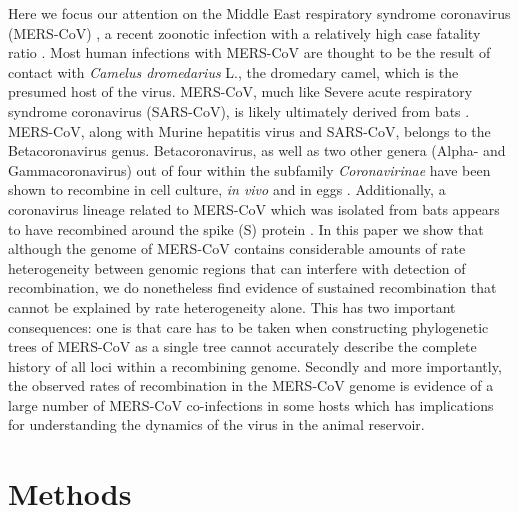 \documentclass[11pt,oneside,letterpaper]{article}
\begin{document}
Here we focus our attention on the Middle East respiratory syndrome coronavirus (MERS-CoV) \citep{zaki_2012}, a recent zoonotic infection with a relatively high case fatality ratio \citep{cauchemez_2014,memish_2013,assiri_2013}.
Most human infections with MERS-CoV are thought to be the result of contact with \textit{Camelus dromedarius} L., the dromedary camel, which is the presumed host of the virus.
MERS-CoV, much like Severe acute respiratory syndrome coronavirus (SARS-CoV), is likely ultimately derived from bats \citep{corman_rooting_2014}.
MERS-CoV, along with Murine hepatitis virus and SARS-CoV, belongs to the Betacoronavirus genus.
Betacoronavirus, as well as two other genera (Alpha- and Gammacoronavirus) out of four within the subfamily \textit{Coronavirinae} have been shown to recombine in cell culture, \textit{in vivo} and in eggs \citep{lai_1985,makino_1986,keck_1988,kottier_1995,herrewegh_1998}.
Additionally, a coronavirus lineage related to MERS-CoV which was isolated from bats appears to have recombined around the spike (S) protein \citep{corman_rooting_2014}.
In this paper we show that although the genome of MERS-CoV contains considerable amounts of rate heterogeneity between genomic regions that can interfere with detection of recombination, we do nonetheless find evidence of sustained recombination that cannot be explained by rate heterogeneity alone.
This has two important consequences: one is that care has to be taken when constructing phylogenetic trees of MERS-CoV as a single tree cannot accurately describe the complete history of all loci within a recombining genome.
Secondly and more importantly, the observed rates of recombination in the MERS-CoV genome is evidence of a large number of MERS-CoV co-infections in some hosts which has implications for understanding the dynamics of the virus in the animal reservoir.

\section*{Methods}
\end{document}
